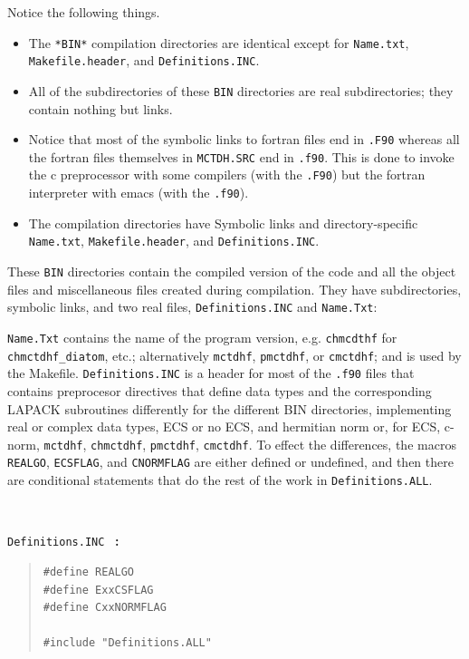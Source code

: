 \documentclass[10pt,leqno, oneside]{book}
\begin{document}
Notice the following things.
\begin{itemize}
\item{The \verb#*BIN*# compilation directories are identical 
except for \verb#Name.txt#, \verb#Makefile.header#, and \verb#Definitions.INC#.}
\item{All of the subdirectories of these \verb#BIN# directories are real subdirectories; they contain nothing but links.}
\item{Notice that most of the symbolic links to fortran files end in \verb#.F90# whereas all the fortran files themselves
in \verb#MCTDH.SRC# end in \verb#.f90#.  This is done to invoke the c preprocessor with some compilers (with the
\verb#.F90#) but the fortran interpreter with emacs (with the \verb#.f90#).}
\item{The compilation directories have
Symbolic links and directory-specific 
 \verb#Name.txt#, \verb#Makefile.header#, and \verb#Definitions.INC#.}
\end{itemize}


These \verb#BIN# directories contain the compiled version of the code and all the object files and miscellaneous files created
during compilation.
They have subdirectories, symbolic links, and two real files, \verb#Definitions.INC# and \verb#Name.Txt#:


%
\verb#Name.Txt# contains the name of the program version, e.g. \verb#chmcdthf# for \verb#chmctdhf_diatom#, etc.;  
alternatively
\verb#mctdhf#, \verb#pmctdhf#, or \verb#cmctdhf#; and is used by the Makefile.
\verb#Definitions.INC# is a header for most of the \verb#.f90# files that contains preprocesor directives that define data 
types and the corresponding LAPACK subroutines differently for the different BIN directories, implementing real or 
complex data types, ECS or no ECS, and hermitian norm or, for ECS, c-norm, \verb#mctdhf#, \verb#chmctdhf#,
\verb#pmctdhf#, \verb#cmctdhf#.  To effect the differences, the macros \verb#REALGO#, 
\verb#ECSFLAG#, and \verb#CNORMFLAG# are either defined or undefined, and then there are conditional statements 
that do the rest of the work in \verb#Definitions.ALL#.

\

\verb#Definitions.INC# \ {\bf :}

{\small
\begin{quote}
\begin{verbatim}
#define REALGO
#define ExxCSFLAG
#define CxxNORMFLAG

#include "Definitions.ALL"
\end{verbatim}
\end{quote}}
\end{document}
